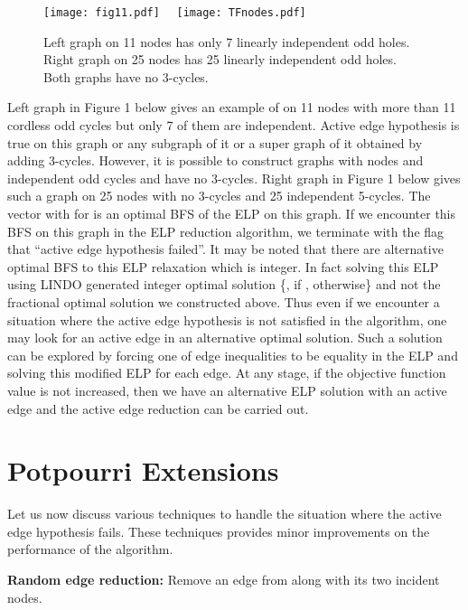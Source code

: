 \documentclass[12pt]{article}
\begin{document}
\begin{center}
\begin{figure}
\texttt{[image: fig11.pdf]}  \ \  \texttt{[image: TFnodes.pdf]}
  \caption{Left graph on 11 nodes has only 7 linearly independent odd holes.
  Right graph on 25 nodes has 25 linearly independent odd holes. Both graphs have no 3-cycles.}\label{fig1}
\end{figure}
\end{center}

Left graph in Figure 1 below gives an example of  on 11
nodes with more than 11 cordless odd cycles but only 7 of them are
independent. Active edge hypothesis is true on this graph or any
subgraph of it or a super graph of it obtained by adding 3-cycles.
However, it is possible to construct graphs with  nodes and 
independent odd cycles and
have no 3-cycles.
Right graph in Figure 1 below gives such a graph on 25 nodes with
no 3-cycles and 25 independent 5-cycles. The vector with 
for  is an optimal BFS of the ELP on this graph.
If we encounter this BFS on this graph in the ELP reduction
algorithm, we terminate with the flag that ``active edge
hypothesis failed''. It may be noted that there are alternative
optimal BFS to this ELP relaxation which is integer. In fact
solving this  ELP using LINDO generated integer optimal solution
\{, if , otherwise\}
and not the fractional optimal solution we constructed above. Thus
even if we encounter a situation where the active edge hypothesis
is not satisfied in the algorithm, one may look for an active edge
in an alternative optimal solution. Such a solution can be
explored by forcing one of edge inequalities to be equality in the
ELP and solving this modified ELP for each edge. At any stage, if
the objective function value is not increased, then we have an
alternative ELP solution with an active
edge and the active edge reduction can be carried out.\\

\section{Potpourri Extensions}

Let us now discuss various techniques to handle the situation where
the active edge hypothesis fails. These techniques provides minor
improvements on the performance of the algorithm.

\vskip 5pt

\noindent \textbf{Random edge reduction:}  Remove an edge
 from  along with its two incident nodes.
\end{document}
